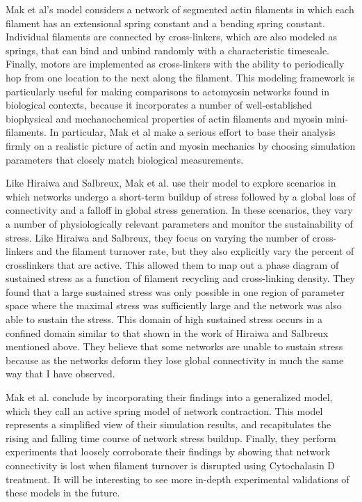 Mak et al's model considers a network of segmented actin filaments in which each filament has an extensional spring constant and a bending spring constant.  Individual filaments are connected by cross-linkers, which are also modeled as springs, that can bind and unbind randomly with a characteristic timescale.  Finally, motors are implemented as cross-linkers with the ability to periodically hop from one location to the next along the filament.  This modeling framework is particularly useful for making comparisons to actomyosin networks found in biological contexts,  because it incorporates a number of well-established biophysical and mechanochemical  properties of actin filaments and myosin mini-filaments.  In particular, Mak et al make a serious effort to base their analysis firmly on a realistic picture of actin and myosin mechanics by choosing simulation parameters that closely match biological measurements. 

Like Hiraiwa and Salbreux, Mak et al. use their model to explore scenarios in which networks undergo a short-term buildup of stress followed by a global loss of connectivity and a falloff in global stress generation.  In these scenarios, they vary a number of physiologically relevant parameters and monitor the sustainability of stress.  Like Hiraiwa and Salbreux, they focus on varying the number of cross-linkers and the filament turnover rate, but they also explicitly vary the percent of crosslinkers that are active.  This allowed them to map out a phase diagram of sustained stress as a function of filament recycling and cross-linking density. They found that a large sustained stress was only possible in one region of parameter space where the maximal stress was sufficiently large and the network was also able to sustain the stress.  This domain of high sustained stress occurs in a confined domain similar to that shown in the work of Hiraiwa and Salbreux mentioned above. They believe that some networks are unable to sustain stress because as the networks deform they lose global connectivity in much the same way that I have observed.  

Mak et al. conclude by incorporating their findings into a generalized model, which they call an active spring model of network contraction.  This model represents a simplified view of their simulation results, and recapitulates the rising and falling time course of network stress buildup.  Finally, they perform experiments that loosely corroborate their findings by showing that network connectivity is lost when filament turnover is disrupted using Cytochalasin D treatment.  It will be interesting to see more in-depth experimental validations of these models in the future.

